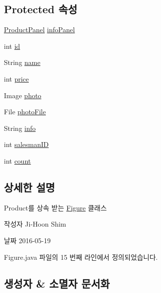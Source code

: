 \subsection*{Protected 속성}
\begin{DoxyCompactItemize}
\item 
\hyperlink{classpkg_1_1_product_panel}{Product\+Panel} \hyperlink{classpkg_1_1_product_a6755de182d9383bc860fa44a8a01789d}{info\+Panel}
\item 
int \hyperlink{classpkg_1_1_product_ac7846687b2d11faba3be1395fcbbab72}{id}
\item 
String \hyperlink{classpkg_1_1_product_acdadb9558664acdfd23eff5b2b77ae90}{name}
\item 
int \hyperlink{classpkg_1_1_product_a46c6eb6906d4ee2f6393515f41dba7c9}{price}
\item 
Image \hyperlink{classpkg_1_1_product_a5d279eb4556860b90305cc26a3ee69be}{photo}
\item 
File \hyperlink{classpkg_1_1_product_a2eeaba74c302ecdc9dd288ff7527ac67}{photo\+File}
\item 
String \hyperlink{classpkg_1_1_product_ade3d909a0e7d15ec98c2f27eecd637cd}{info}
\item 
int \hyperlink{classpkg_1_1_product_aecf411b201022fca17571e9afbc76747}{salesman\+ID}
\item 
int \hyperlink{classpkg_1_1_product_ac136af1e8637edc22218dd9c3383266b}{count}
\end{DoxyCompactItemize}


\subsection{상세한 설명}
Product를 상속 받는 \hyperlink{classpkg_1_1_figure}{Figure} 클래스 

\begin{DoxyAuthor}{작성자}
Ji-\/\+Hoon Shim 
\end{DoxyAuthor}
\begin{DoxyDate}{날짜}
2016-\/05-\/19 
\end{DoxyDate}


Figure.\+java 파일의 15 번째 라인에서 정의되었습니다.



\subsection{생성자 \& 소멸자 문서화}
